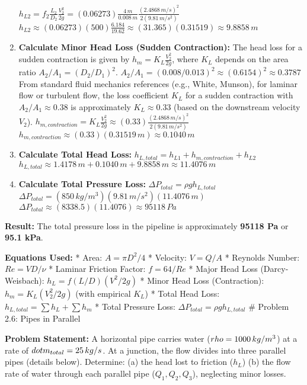 \begin{enumerate}
  \(h_{L2} = f_2 \frac{L_2}{D_2} \frac{V_2^2}{2g} = (0.06273) \frac{4 \, m}{0.008 \, m} \frac{(2.4868 \, m/s)^2}{2(9.81 \, m/s^2)}\)
  \(h_{L2} \approx (0.06273)(500) \frac{6.184}{19.62} \approx (31.365)(0.31519) \approx 9.8858 \, m\)
\item
  \textbf{Calculate Minor Head Loss (Sudden Contraction):} The head loss
  for a sudden contraction is given by \(h_m = K_L \frac{V_2^2}{2g}\),
  where \(K_L\) depends on the area ratio \(A_2/A_1 = (D_2/D_1)^2\).
  \(A_2/A_1 = (0.008/0.013)^2 \approx (0.6154)^2 \approx 0.3787\) From
  standard fluid mechanics references (e.g., White, Munson), for laminar
  flow or turbulent flow, the loss coefficient \(K_L\) for a sudden
  contraction with \(A_2/A_1 \approx 0.38\) is approximately
  \(K_L \approx 0.33\) (based on the downstream velocity \(V_2\)).
  \(h_{m, contraction} = K_L \frac{V_2^2}{2g} \approx (0.33) \frac{(2.4868 \, m/s)^2}{2(9.81 \, m/s^2)}\)
  \(h_{m, contraction} \approx (0.33)(0.31519 \, m) \approx 0.1040 \, m\)
\item
  \textbf{Calculate Total Head Loss:}
  \(h_{L, total} = h_{L1} + h_{m, contraction} + h_{L2}\)
  \(h_{L, total} \approx 1.4178 \, m + 0.1040 \, m + 9.8858 \, m \approx 11.4076 \, m\)
\item
  \textbf{Calculate Total Pressure Loss:}
  \(\Delta P_{total} = \rho g h_{L, total}\)
  \(\Delta P_{total} = (850 \, kg/m^3)(9.81 \, m/s^2)(11.4076 \, m)\)
  \(\Delta P_{total} \approx (8338.5)(11.4076) \approx 95118 \, Pa\)
\end{enumerate}

\textbf{Result:} The total pressure loss in the pipeline is
approximately \textbf{95118 Pa} or \textbf{95.1 kPa}.

\textbf{Equations Used:} * Area: \(A = \pi D^2 / 4\) * Velocity:
\(V = Q / A\) * Reynolds Number: \(Re = VD / \nu\) * Laminar Friction
Factor: \(f = 64 / Re\) * Major Head Loss (Darcy-Weisbach):
\(h_L = f (L/D) (V^2 / 2g)\) * Minor Head Loss (Contraction):
\(h_m = K_L (V_2^2 / 2g)\) (with empirical \(K_L\)) * Total Head Loss:
\(h_{L, total} = \sum h_L + \sum h_m\) * Total Pressure Loss:
\(\Delta P_{total} = \rho g h_{L, total}\) \# Problem 2.6: Pipes in
Parallel

\textbf{Problem Statement:} A horizontal pipe carries water
(\(\\rho = 1000 \, kg/m^3\)) at a rate of
\(\\dot{m}_{total} = 25 \, kg/s\). At a junction, the flow divides into
three parallel pipes (details below). Determine: (a) the head lost to
friction (\(h_L\)) (b) the flow rate of water through each parallel pipe
(\(Q_1, Q_2, Q_3\)), neglecting minor losses.

